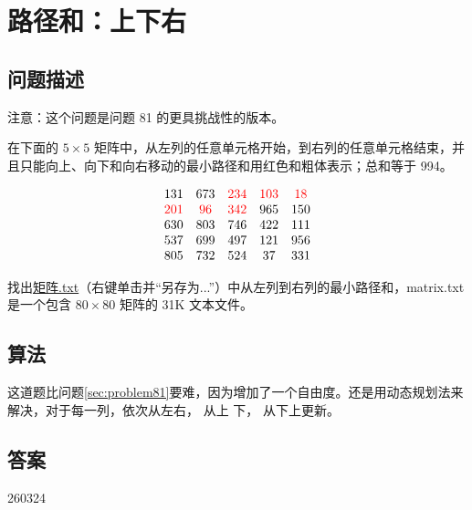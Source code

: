 \section{路径和：上下右}\label{sec:problem82}
\subsection{问题描述}
\begin{tcolorbox}

	注意：这个问题是问题 81 的更具挑战性的版本。

	在下面的 $5 \times 5$ 矩阵中，从左列的任意单元格开始，到右列的任意单元格结束，并且只能向上、向下和向右移动的最小路径和用红色和粗体表示；总和等于 994。

	\[
		\begin{array}{ccccc}
			131       & 673      & \textcolor{red}{234} & \textcolor{red}{103} & \textcolor{red}{18} \\
			\textcolor{red}{201} & \textcolor{red}{96} & \textcolor{red}{342} & 965       & 150      \\
			630       & 803      & 746       & 422       & 111      \\
			537       & 699      & 497       & 121       & 956      \\
			805       & 732      & 524       & 37        & 331      \\
		\end{array}
	\]

	找出\href{https://projecteuler.net/resources/documents/0082_matrix.txt}{矩阵.txt}（右键单击并“另存为...”）中从左列到右列的最小路径和，matrix.txt 是一个包含 $80 \times 80$ 矩阵的 31K 文本文件。
\end{tcolorbox}

\subsection{算法}
这道题比问题\ref{sec:problem81}要难，因为增加了一个自由度。还是用动态规划法来解决，对于每一列，依次从左\to 右， 从上\to
下， 从下\to 上更新。
\subsection{答案}
260324
